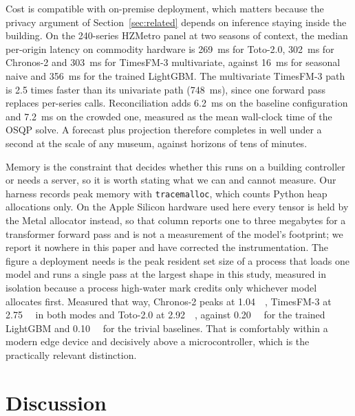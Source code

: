 \documentclass[11pt]{article}
\theoremstyle{plain}
\theoremstyle{definition}
\theoremstyle{remark}
\newif\ifrevisionmarkup
\newcommand{\new}[1]{\ifrevisionmarkup\textcolor{revision}{#1}\else#1\fi}
\begin{document}
Cost is compatible with on-premise deployment, which matters because the privacy argument of Section~\ref{sec:related} depends on inference staying inside the building. On the \num{240}-series HZMetro panel at two seasons of context, the median per-origin latency on commodity hardware is \SI{269}{\milli\second} for Toto-2.0, \SI{302}{\milli\second} for Chronos-2 and \SI{303}{\milli\second} for TimesFM-3 multivariate, against \SI{16}{\milli\second} for seasonal naive and \SI{356}{\milli\second} for the trained LightGBM. The multivariate TimesFM-3 path is \num{2.5} times faster than its univariate path (\SI{748}{\milli\second}), since one forward pass replaces per-series calls. Reconciliation adds \new{\SI{6.2}{\milli\second} on the baseline configuration and \SI{7.2}{\milli\second} on the crowded one, measured as the mean wall-clock time of the OSQP solve}. A forecast plus projection therefore completes in well under a second at the scale of any museum, against horizons of tens of minutes.

Memory is the constraint that decides whether this runs on a building controller or needs a server, so it is worth stating what we can and cannot measure. Our harness records peak memory with \texttt{tracemalloc}, which counts Python heap allocations only. On the Apple Silicon hardware used here every tensor is held by the Metal allocator instead, so that column reports one to three megabytes for a transformer forward pass and is not a measurement of the model's footprint; we report it nowhere in this paper and have corrected the instrumentation. The figure a deployment needs is the peak resident set size of a process that loads one model and runs a single pass at the largest shape in this study, measured in isolation because a process high-water mark credits only whichever model allocates first. Measured that way, Chronos-2 peaks at \SI{1.04}{\gibi\byte}, TimesFM-3 at \SI{2.75}{\gibi\byte} in both modes and Toto-2.0 at \SI{2.92}{\gibi\byte}, against \SI{0.20}{\gibi\byte} for the trained LightGBM and \SI{0.10}{\gibi\byte} for the trivial baselines. That is comfortably within a modern edge device and decisively above a microcontroller, which is the practically relevant distinction.

\section{Discussion}
\label{sec:discussion}
\label{sec:disc}
\end{document}
